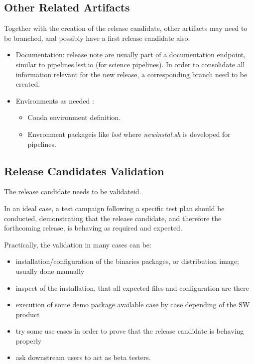 \subsection{Other Related Artifacts}

Together with the creation of the release candidate, other artifacts may need to be branched, and possibly have a first release candidate also:

\begin{itemize}
\item Documentation: release note are usually part of a documentation endpoint, similar to pipelines.lsst.io (for science pipelines). In order to consolidate all information relevant for the new release, a corresponding branch need to be created.
\item Environments  as needed :
	\begin{itemize}
	\item   Conda environment definition.
	\item  Envronment packageis like \textit{lsst}  where \textit{newinstal.sh} is developed for pipelines.
	\end{itemize}
\end{itemize}


\subsection{Release Candidates Validation} \label{sec:rcvalidation}

The release candidate needs to be validateid.

In an ideal case, a test campaign following a specific test plan should be conducted, demonstrating that the release candidate, and therefore the forthcoming release, is behaving as required and expected.

Practically, the validation in many cases can be:

\begin{itemize}
\item installation/configuration of the binaries packages, or distribution image; usually done manually
\item inspect of the installation, that all expected files and configuration are there
\item execution of some demo package available case by case depending of the SW product
\item try some use cases in order to prove that the release candidate is behaving properly
\item ask downstream users to act as beta testers.
\end{itemize}

